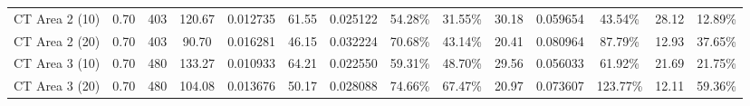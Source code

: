 \documentclass[10pt,a4paper]{article}
\begin{document}
\begin{table}[htbp]
\begin{tabular*}{\textwidth}{@{\extracolsep{\fill}}lcc|cc|cccc|ccc|cc@{}}
\midrule
CT Area 2 (10) & 0.70 & 403 & 120.67 & 0.012735 & 61.55 & 0.025122 & 54.28\% & 31.55\% & 30.18 & 0.059654 & 43.54\% & 28.12 & 12.89\% \\
CT Area 2 (20) & 0.70 & 403 & 90.70  & 0.016281 & 46.15 & 0.032224 & 70.68\% & 43.14\% & 20.41 & 0.080964 & 87.79\% & 12.93 & 37.65\% \\
CT Area 3 (10) & 0.70 & 480 & 133.27 & 0.010933 & 64.21 & 0.022550 & 59.31\% & 48.70\% & 29.56 & 0.056033 & 61.92\% & 21.69 & 21.75\% \\
CT Area 3 (20) & 0.70 & 480 & 104.08 & 0.013676 & 50.17 & 0.028088 & 74.66\% & 67.47\% & 20.97 & 0.073607 & 123.77\% & 12.11 & 59.36\% \\
\bottomrule
\end{tabular*}
\end{table}
\end{document}
